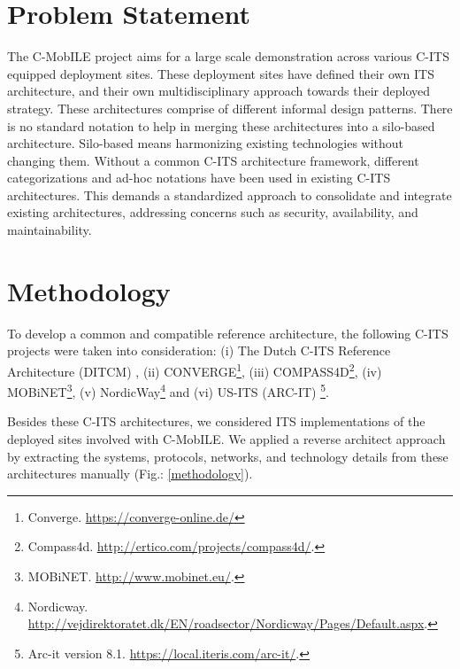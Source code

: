 \documentclass[conference]{IEEEtran}
\begin{document}
\section{Problem Statement}

The C-MobILE project aims for a large scale demonstration across various C-ITS equipped deployment sites. These deployment sites have defined their own ITS architecture, and their own multidisciplinary approach towards their deployed strategy. These architectures comprise of different informal design patterns.
There is no standard notation to help in merging these architectures into a silo-based architecture.
Silo-based means harmonizing existing technologies without changing them.
Without a common C-ITS architecture framework, different categorizations and ad-hoc notations have been used in existing C-ITS architectures.
This demands a standardized approach to consolidate and integrate existing architectures, addressing concerns such as security, availability, and maintainability.




\section{Methodology}

To develop a common and compatible reference architecture, the following C-ITS projects were taken into consideration: (i) The Dutch C-ITS Reference Architecture (DITCM) \cite{ditcm}, (ii) CONVERGE\footnote{Converge. \url{https://converge-online.de/}}, (iii) COMPASS4D\footnote{Compass4d. \url{http://ertico.com/projects/compass4d/}.}, (iv) MOBiNET\footnote{MOBiNET. \url{http://www.mobinet.eu/}.}, (v) NordicWay\footnote{Nordicway. \url{http://vejdirektoratet.dk/EN/roadsector/Nordicway/Pages/Default.aspx}.} and (vi) US-ITS (ARC-IT) \footnote{Arc-it version 8.1. \url{https://local.iteris.com/arc-it/}.}.

Besides these C-ITS architectures, we considered ITS implementations of the deployed sites involved with C-MobILE.
We applied a reverse architect approach by extracting the systems, protocols, networks, and technology details from these architectures manually (Fig.: \ref{methodology}).
\end{document}

